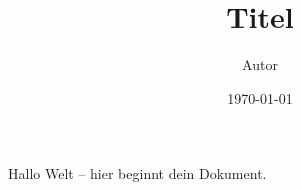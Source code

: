 \documentclass[12pt,a4paper]{article}
\title{Titel}
\author{Autor}
\date{\today}
\begin{document}
\maketitle

Hallo Welt – hier beginnt dein Dokument.
\end{document}
